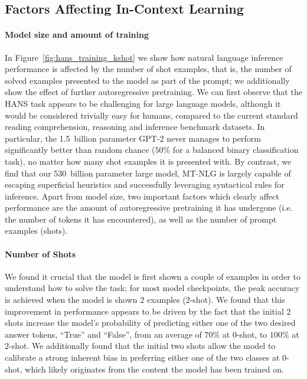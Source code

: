 \documentclass[11pt]{article}
\newcommand{\ours}{MT-NLG}
\begin{document}
\subsection{Factors Affecting In-Context Learning}
\paragraph{Model size and amount of training} In Figure~\ref{fig:hans_training_kshot} we show how natural language inference performance is affected by the number of shot examples, that is, the number of solved examples presented to the model as part of the prompt; we additionally show the effect of further autoregressive pretraining. We can first observe that the HANS task appears to be challenging for large language models, although it would be considered trivially easy for humans, compared to the current standard reading comprehension, reasoning and inference benchmark datasets. In particular, the 1.5~billion parameter GPT-2 never manages to perform significantly better than random chance ($50\%$ for a balanced binary classification task), no matter how many shot examples it is presented with. By contrast, we find that our 530~billion parameter large model, {\ours} is largely capable of escaping superficial heuristics and successfully leveraging syntactical rules for inference. Apart from model size, two important factors which clearly affect performance are the amount of autoregressive pretraining it has undergone (i.e. the number of tokens it has encountered), as well as the number of prompt examples (shots).

\paragraph{Number of Shots}  We found it crucial that the model is first shown a couple of examples in order to understand how to solve the task; for most model checkpoints, the peak accuracy is achieved when the model is shown 2 examples (2-shot). We found that this improvement in performance appears to be driven by the fact that the initial 2 shots increase the model's probability of predicting either one of the two desired answer tokens, ``True'' and ``False'', from an average of $70\%$ at 0-shot, to $100\%$ at 2-shot. We additionally found that the initial two shots allow the model to calibrate a strong inherent bias in preferring either one of the two classes at 0-shot, which likely originates from the content the model has been trained on.
\end{document}
